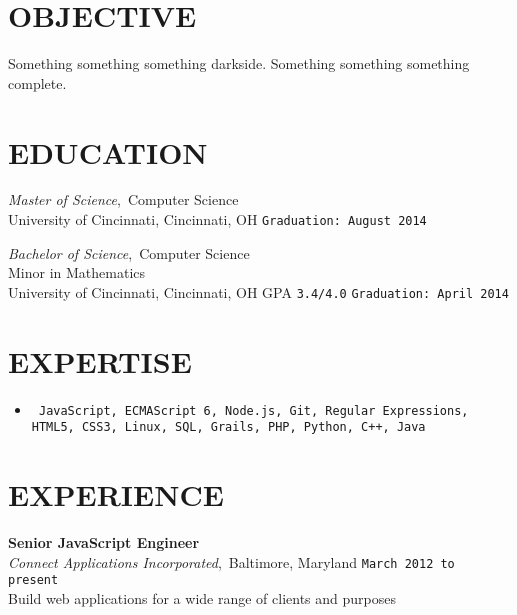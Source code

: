 \documentclass[11pt, line]{res}
\begin{document}
	\address{8228 Melrose Ln\\ Maineville, OH 45039\\ 513-259-0656\\ ross@rhadden.com}

	\begin{resume}
		\vspace{-16pt}
		\section{OBJECTIVE}
			Something something something darkside.  Something something something complete.

		\section{EDUCATION}
				\textit{Master of Science},\, Computer Science \\
				University of Cincinnati, Cincinnati, OH
					\hfill \texttt{Graduation: August 2014}

			\vspace{-2pt}
				\textit{Bachelor of Science},\, Computer Science \\
				Minor in Mathematics \\
				University of Cincinnati, Cincinnati, OH
					\hspace{16pt} GPA \texttt{3.4/4.0}
					\hfill \texttt{Graduation: April 2014}

		\section{EXPERTISE}
			\begin{itemize}[leftmargin=0pt]
				\item[]
				\texttt{
					JavaScript,
					ECMAScript 6,
					Node.js,
					Git,
					Regular Expressions,
					HTML5,
					CSS3,
					Linux,
					SQL,
					Grails,
					PHP,
					Python,
					C++,
					Java
				}
			\end{itemize}

		\section{EXPERIENCE}
				\textbf{Senior JavaScript Engineer} \\
				\textit{Connect Applications Incorporated},\, Baltimore, Maryland
					\hfill \texttt{March 2012 to present} \\
				Build web applications for a wide range of clients and purposes


\end{resume}
\end{document}
